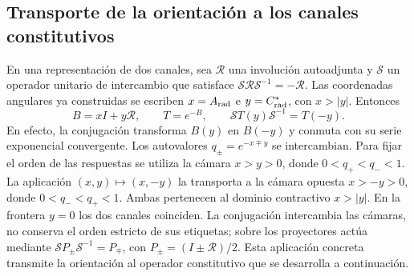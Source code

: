 \subsection{Transporte de la orientación a los canales constitutivos}

En una representación de dos canales, sea $\mathcal R$ una involución
autoadjunta y $\mathcal S$ un operador unitario de intercambio que satisface
$\mathcal S\mathcal R\mathcal S^{-1}=-\mathcal R$. Las coordenadas angulares
ya construidas se escriben $x=A_{\rm rad}$ e $y=C^*_{\rm rad}$, con $x>|y|$.
Entonces
\begin{equation}
 B=xI+y\mathcal R,\qquad T=e^{-B},\qquad
 \mathcal ST(y)\mathcal S^{-1}=T(-y).
 \label{iii:eq:channel-conjugation}
\end{equation}
En efecto, la conjugación transforma $B(y)$ en $B(-y)$ y conmuta con su serie
exponencial convergente. Los autovalores $q_\pm=e^{-x\mp y}$ se intercambian.
Para fijar el orden de las respuestas se utiliza la cámara $x>y>0$, donde
$0<q_+<q_-<1$. La aplicación $(x,y)\mapsto(x,-y)$ la transporta a la
cámara opuesta $x>-y>0$, donde $0<q_-<q_+<1$. Ambas pertenecen al dominio
contractivo $x>|y|$. En la frontera $y=0$ los dos canales coinciden.
La conjugación intercambia las cámaras, no conserva el orden estricto de
sus etiquetas; sobre los proyectores actúa mediante
$\mathcal SP_\pm\mathcal S^{-1}=P_\mp$, con
$P_\pm=(I\pm\mathcal R)/2$.
Esta aplicación concreta transmite la orientación al operador constitutivo que
se desarrolla a continuación.
